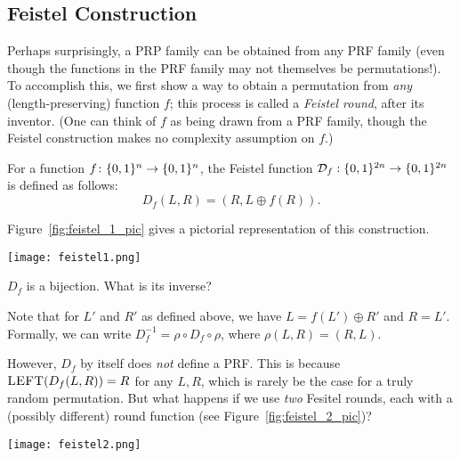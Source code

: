 \documentclass[11pt]{article}
\begin{document}
\subsection{Feistel Construction}
\label{sec:feistel-construction}

Perhaps surprisingly, a PRP family can be obtained from any PRF family
(even though the functions in the PRF family may not themselves be
permutations!).  To accomplish this, we first show a way to obtain a
permutation from \emph{any} (length-preserving) function $f$; this
process is called a \emph{Feistel round}, after its inventor.  (One
can think of $f$ as being drawn from a PRF family, though the Feistel
construction makes no complexity assumption on $f$.)

\begin{definition}
  \label{def:feistel-round}
  For a function $f \colon \{0,1\}^{n} \to \{0,1\}^{n}$, the Feistel
  function $\mathcal D_f : \{0,1\}^{2n} \rightarrow \{0,1\}^{2n}$ is defined
  as follows:
  \[ D_f(L, R) = (R,L \oplus f(R) ). \]
\end{definition}

Figure~\ref{fig:feistel_1_pic} gives a pictorial representation of
this construction.

\begin{center}
  \centering
  \texttt{[image: feistel1.png]}
  \label{fig:feistel_1_pic}
\end{center}

\begin{question}
  \(D_f\) is a bijection. What is its inverse?
\end{question}

\begin{answer}
  Note that for $L'$ and $R'$ as defined above, we have
  $L = f(L') \oplus R'$ and $R = L'$.  Formally, we can write
  $D_{f}^{-1} = \rho \circ D_f \circ \rho$, where $\rho(L,R) = (R,L)$.
\end{answer}

However, $D_{f}$ by itself does \emph{not} define a PRF.  This is
because $\textsc{LEFT}( D_f(L,R) ) = R$ for any $L,R$, which is rarely
be the case for a truly random permutation.  But what happens if we
use \emph{two} Fesitel rounds, each with a (possibly different) round
function (see Figure~\ref{fig:feistel_2_pic})?

\begin{center}
  \centering
  \texttt{[image: feistel2.png]}
  \label{fig:feistel_2_pic}
\end{center}
\end{document}
